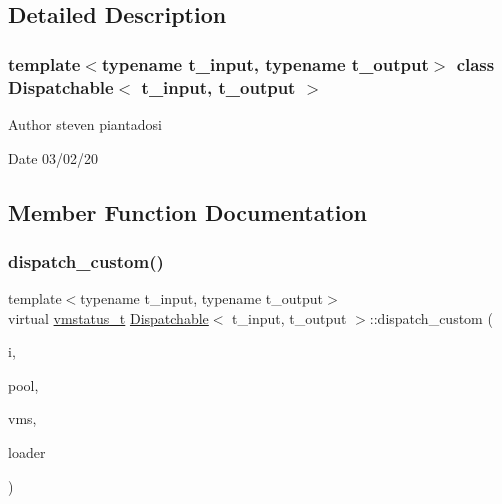 \subsection{Detailed Description}
\subsubsection*{template$<$typename t\+\_\+input, typename t\+\_\+output$>$\newline
class Dispatchable$<$ t\+\_\+input, t\+\_\+output $>$}

\begin{DoxyAuthor}{Author}
steven piantadosi 
\end{DoxyAuthor}
\begin{DoxyDate}{Date}
03/02/20 
\end{DoxyDate}


\subsection{Member Function Documentation}
\mbox{\label{class_dispatchable_a6d2bd844b0e55378d29ed85e718d0a77}} 
\subsubsection{\texorpdfstring{dispatch\+\_\+custom()}{dispatch\_custom()}}
{\footnotesize\ttfamily template$<$typename t\+\_\+input, typename t\+\_\+output$>$ \\
virtual \hyperlink{_instruction_8h_a6202215407ab29590bb936ca2996cf64}{vmstatus\+\_\+t} \hyperlink{class_dispatchable}{Dispatchable}$<$ t\+\_\+input, t\+\_\+output $>$\+::dispatch\+\_\+custom (\begin{DoxyParamCaption}\item[{\hyperlink{class_instruction}{Instruction}}]{i,  }\item[{\hyperlink{class_virtual_machine_pool}{Virtual\+Machine\+Pool}$<$ t\+\_\+input, t\+\_\+output $>$ $\ast$}]{pool,  }\item[{\hyperlink{class_virtual_machine_state}{Virtual\+Machine\+State}$<$ t\+\_\+input, t\+\_\+output $>$ $\ast$}]{vms,  }\item[{\hyperlink{class_dispatchable}{Dispatchable}$<$ t\+\_\+input, t\+\_\+output $>$ $\ast$}]{loader }\end{DoxyParamCaption})\hspace{0.3cm}{\ttfamily [pure virtual]}}



